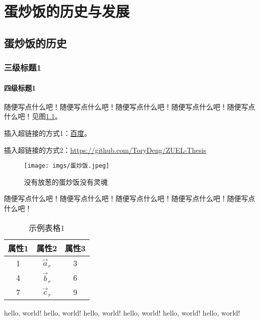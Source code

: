 \chapter{蛋炒饭的历史与发展}
\section{蛋炒饭的历史}
\subsection{三级标题1}
\subsubsection{四级标题1}
随便写点什么吧！随便写点什么吧！随便写点什么吧！随便写点什么吧！随便写点什么吧！见图\ref{fig:my_label}。

插入超链接的方式1：\href{http://www.baidu.com}{百度}。 \par
插入超链接的方式2：\url{https://github.com/ToryDeng/ZUEL-Thesis}

\begin{figure}[ht]
    \centering
    \texttt{[image: imgs/蛋炒饭.jpeg]}
    \caption{没有放葱的蛋炒饭没有灵魂}
    \label{fig:my_label}
\end{figure}

随便写点什么吧！随便写点什么吧！随便写点什么吧！随便写点什么吧！随便写点什么吧！
\begin{table}[htbp]
\centering
\captionsetup{skip=0pt} %
\caption{示例表格1}
    \begin{tabular}{ccc}
    \toprule
    \textbf{属性1} & \textbf{属性2} & \textbf{属性3} \\ \midrule
    1            & $\Vec{a}_r$  & 3            \\
    4            & $\Vec{b}_r$  & 6            \\
    7            & $\Vec{c}_r$  & 9            \\ \bottomrule
    \end{tabular}\label{tab:exp_table1}
\end{table}

hello, world! hello, world! hello, world! hello, world! hello, world! hello, world!
